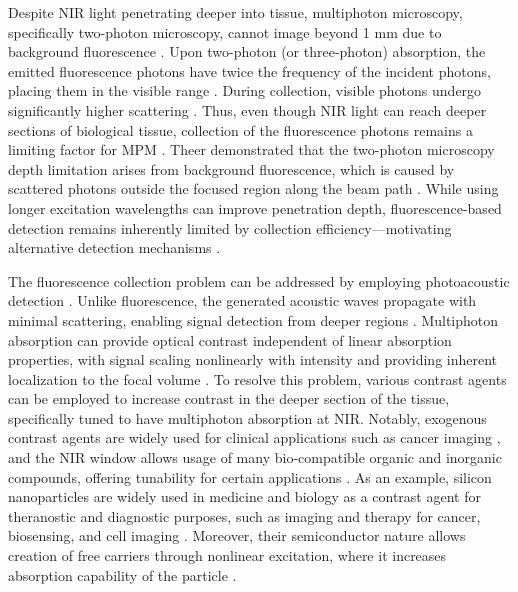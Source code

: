 \documentclass{optica-article}
\begin{document}
Despite NIR light penetrating deeper into tissue, multiphoton microscopy, specifically two-photon microscopy, cannot image beyond 1 mm due to background fluorescence \cite{Helmchen-2005}. Upon two-photon (or three-photon) absorption, the emitted fluorescence photons have twice the frequency of the incident photons, placing them in the visible range \cite{Denk-1990}. During collection, visible photons undergo significantly higher scattering \cite{kobat-2009}. Thus, even though NIR light can reach deeper sections of biological tissue, collection of the fluorescence photons remains a limiting factor for MPM \cite{kobat-2009}. Theer demonstrated that the two-photon microscopy depth limitation arises from background fluorescence, which is caused by scattered photons outside the focused region along the beam path \cite{theer-2006}. While using longer excitation wavelengths can improve penetration depth, fluorescence-based detection remains inherently limited by collection efficiency---motivating alternative detection mechanisms \cite{kobat-2009}.

The fluorescence collection problem can be addressed by employing photoacoustic detection \cite{Xu-2006}. Unlike fluorescence, the generated acoustic waves propagate with minimal scattering, enabling signal detection from deeper regions \cite{Maslov-2008}. Multiphoton absorption can provide optical contrast independent of linear absorption properties, with signal scaling nonlinearly with intensity and providing inherent localization to the focal volume \cite{Helmchen-2005}. To resolve this problem, various contrast agents can be employed to increase contrast in the deeper section of the tissue, specifically tuned to have multiphoton absorption at NIR. Notably, exogenous contrast agents are widely used for clinical applications such as cancer imaging \cite{Vahrmeijer2013}, and the NIR window allows usage of many bio-compatible organic and inorganic compounds, offering tunability for certain applications \cite{shaw2022two}. As an example, silicon nanoparticles are widely used in medicine and biology as a contrast agent for theranostic and diagnostic purposes, such as imaging and therapy for cancer, biosensing, and cell imaging \cite{ofarrell2006,peng2014,arap2013, mochizuki2021}. Moreover, their semiconductor nature allows creation of free carriers through nonlinear excitation, where it increases absorption capability of the particle \cite{trinh2012, boggess1986}.
\end{document}
